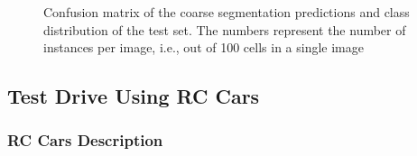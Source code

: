 \documentclass{ctuthesis/ctuthesis}
\begin{document}
\begin{figure}[h]
    \centering
    \quad
    \caption[Confusion matrix of the coarse segmentation predictions and class distribution of the test set]{Confusion matrix of the coarse segmentation predictions and class distribution of the test set. The numbers represent the number of instances per image, i.e., out of 100 cells in a single image}
    \label{fig:segmentation_results}%
\end{figure}



\subsection{Test Drive Using RC Cars}
\subsubsection{RC Cars Description}
\end{document}
